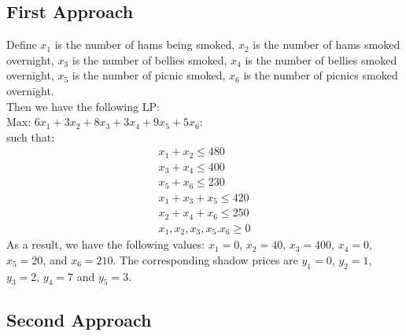 \documentclass{article}
\begin{document}

\subsection{First Approach}

Define $x_1$ is the number of hams being smoked, $x_2$ is the number of hams smoked overnight,
$x_3$ is the number of bellies smoked, $x_4$ is the number of bellies smoked overnight,
$x_5$ is the number of picnic smoked, $x_6$ is the number of picnics smoked overnight. \\
Then we have the following LP: \\
Max: $6x_1 + 3x_2 + 8x_3 + 3x_4+ 9x_5 +5x_6$: \\
such that:
\begin{align*}
	x_1 + x_2 \leq 480 \\
	x_3 + x_4 \leq 400 \\
	x_5 + x_6 \leq 230 \\
	x_1 + x_3 + x_5 \leq 420 \\
	x_2 + x_4 + x_6 \leq 250 \\
	x_1, x_2, x_3, x_5. x_6 \geq 0
\end{align*}
As a result, we have the following values: $x_1 = 0$, $x_2 = 40$, $x_3 = 400$, $x_4 = 0$,
$x_5 = 20$, and $x_6 = 210$. The corresponding shadow prices are $y_1 = 0$, $y_2 =1$, 
$y_3=2$, $y_4 = 7$ and $y_5 = 3$.

\subsection{Second Approach}
\end{document}
